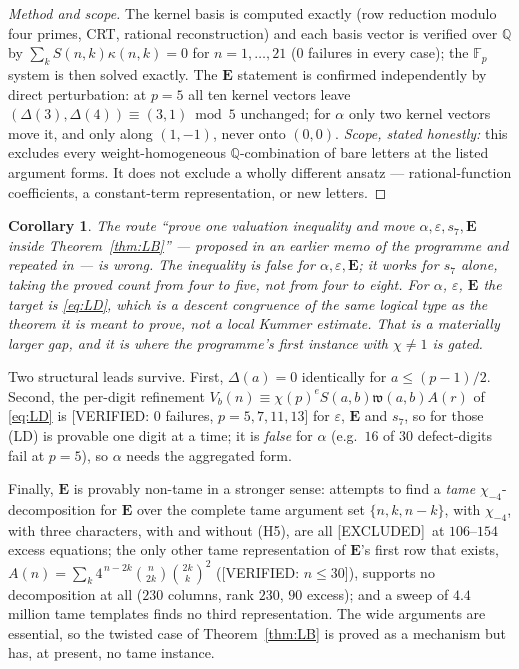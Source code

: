 \documentclass[11pt,reqno]{amsart}
\theoremstyle{plain}
\newtheorem{corollary}[theorem]{Corollary}
\theoremstyle{definition}
\theoremstyle{remark}
\newcommand{\Q}{\mathbb{Q}}
\newcommand{\bin}[2]{\binom{#1}{#2}}
\newcommand{\VerifiedR}[1]{\textup{\textsf{[VERIFIED: #1]}}}
\newcommand{\Excluded}{\textup{\textsf{[EXCLUDED]}}}
\numberwithin{equation}{section}
\begin{document}
\begin{proof}[Method and scope]
The kernel basis is computed exactly (row reduction modulo four primes, CRT, rational
reconstruction) and each basis vector is verified over $\Q$ by
$\sum_kS(n,k)\kappa(n,k)=0$ for $n=1,\dots,21$ ($0$ failures in every case); the
$\mathbb F_p$ system is then solved exactly. The $\mathbf E$ statement is confirmed
independently by direct perturbation: at $p=5$ all ten kernel vectors leave
$(\Delta(3),\Delta(4))\equiv(3,1)\bmod 5$ unchanged; for $\alpha$ only two kernel vectors
move it, and only along $(1,-1)$, never onto $(0,0)$.
\emph{Scope, stated honestly:} this excludes every weight-homogeneous $\Q$-combination of
bare letters at the listed argument forms. It does not exclude a wholly different ansatz ---
rational-function coefficients, a constant-term representation, or new letters.
\end{proof}

\begin{corollary}\label{cor:count}
The route ``prove one valuation inequality and move $\alpha,\varepsilon,s_7,\mathbf E$
inside Theorem~\ref{thm:LB}'' --- proposed in an earlier memo of the programme and repeated
in \cite[\S9]{CompanionLucas2nd} --- is wrong. The inequality is false for
$\alpha,\varepsilon,\mathbf E$; it works for $s_7$ alone, taking the proved count from four
to five, not from four to eight. For $\alpha$, $\varepsilon$, $\mathbf E$ the target is
\eqref{eq:LD}, which is a \emph{descent} congruence of the same logical type as the theorem
it is meant to prove, not a local Kummer estimate. That is a materially larger gap, and it
is where the programme's first instance with $\chi\ne1$ is gated.
\end{corollary}

Two structural leads survive. First, $\Delta(a)=0$ identically for $a\le(p-1)/2$. Second,
the per-digit refinement $V_b(n)\equiv\chi(p)^{e}S(a,b)\mathfrak w(a,b)A(r)$ of
\eqref{eq:LD} is \VerifiedR{$0$ failures, $p=5,7,11,13$} for $\varepsilon$, $\mathbf E$ and
$s_7$, so for those (LD) is provable one digit at a time; it is \emph{false} for $\alpha$
(e.g.\ $16$ of $30$ defect-digits fail at $p=5$), so $\alpha$ needs the aggregated form.

Finally, $\mathbf E$ is provably non-tame in a stronger sense: attempts to find a
\emph{tame} $\chi_{-4}$-decomposition for $\mathbf E$ over the complete tame argument set
$\{n,k,n-k\}$, with $\chi_{-4}$, with three characters, with and without (H5), are all
\Excluded\ at $106$--$154$ excess equations; the only other tame representation of
$\mathbf E$'s first row that exists, $A(n)=\sum_k4^{\,n-2k}\bin n{2k}\bin{2k}k^2$
(\VerifiedR{$n\le30$}), supports no decomposition at all ($230$ columns, rank $230$, $90$
excess); and a sweep of $4.4$ million tame templates finds no third representation. The wide
arguments are essential, so the twisted case of Theorem~\ref{thm:LB} is proved as a
mechanism but has, at present, no tame instance.
\end{document}
